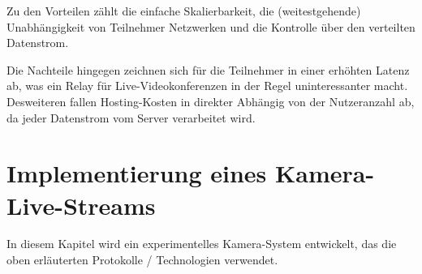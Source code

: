 \documentclass{article}
\begin{document}
\begin{onecolumn}
Zu den Vorteilen zählt die einfache Skalierbarkeit, die (weitestgehende)
Unabhängigkeit von Teilnehmer Netzwerken und die Kontrolle über den verteilten
Datenstrom.

Die Nachteile hingegen zeichnen sich für die Teilnehmer in einer erhöhten
Latenz ab, was ein Relay für Live-Videokonferenzen in der Regel uninteressanter
macht. Desweiteren fallen Hosting-Kosten in direkter Abhängig von der
Nutzeranzahl ab, da jeder Datenstrom vom Server verarbeitet wird.




\section{Implementierung eines Kamera-Live-Streams}

In diesem Kapitel wird ein experimentelles Kamera-System entwickelt, das die
oben erläuterten Protokolle / Technologien verwendet.


\end{onecolumn}
\end{document}
